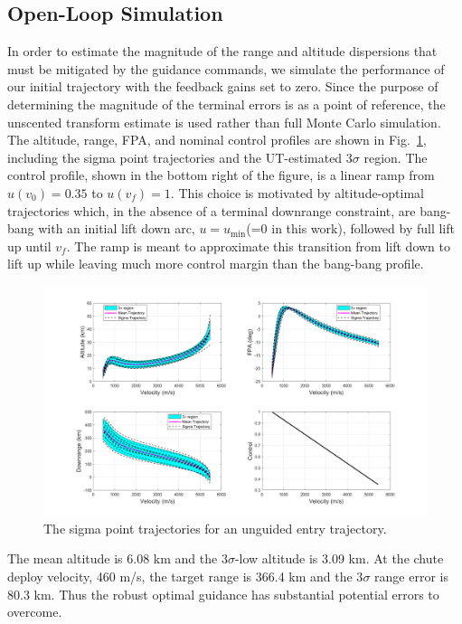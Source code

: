 \documentclass[journal ]{new-aiaa}
\begin{document}
\subsection*{Open-Loop Simulation}
In order to estimate the magnitude of the range and altitude dispersions that must be mitigated by the guidance commands, we simulate the performance of our initial trajectory with the feedback gains set to zero. Since the purpose of determining the magnitude of the terminal errors is as a point of reference, the unscented transform estimate is used rather than full Monte Carlo simulation. The altitude, range, FPA, and nominal control profiles are shown in Fig.~\ref{Fig:OpenLoop}, including the sigma point trajectories and the UT-estimated 3$\sigma$ region. The control profile, shown in the bottom right of the figure, is a linear ramp from $u(v_0)=0.35$ to $ u(v_f)=1 $. This choice is motivated by altitude-optimal trajectories which, in the absence of a terminal downrange constraint, are bang-bang with an initial lift down arc, $u=u_{\min}$(=0 in this work), followed by full lift up until $v_f$. The ramp is meant to approximate this transition from lift down to lift up while leaving much more control margin than the bang-bang profile. 
\begin{figure}[h!]
	\centering
	\includegraphics[width=1\textwidth]{ddp/matlab/HeavyOpenLoopGrid}
	\caption{The sigma point trajectories for an unguided entry trajectory.}
	\label{Fig:OpenLoop}
\end{figure}
The mean altitude is 6.08 km and the 3$\sigma$-low altitude is 3.09 km. At the chute deploy velocity, 460 m/s, the target range is 366.4 km and the 3$\sigma$ range error is $80.3$ km. Thus the robust optimal guidance has substantial potential errors to overcome. 
\end{document}
